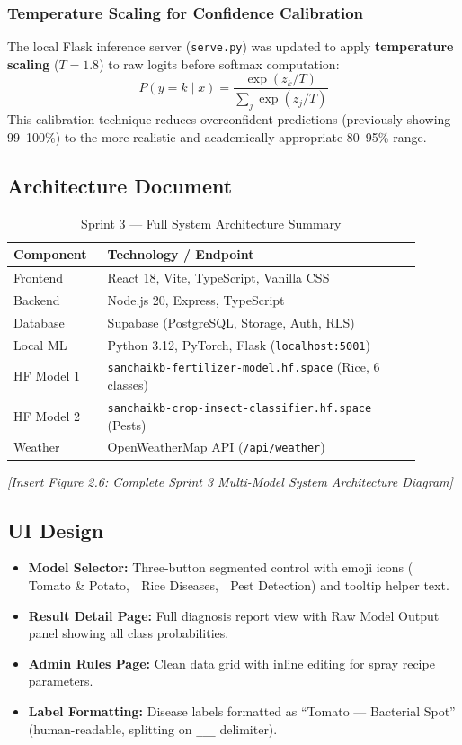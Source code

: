 \documentclass[12pt,a4paper]{report}
\begin{document}
\subsubsection{Temperature Scaling for Confidence Calibration}
The local Flask inference server (\texttt{serve.py}) was updated to apply \textbf{temperature scaling} ($T = 1.8$) to raw logits before softmax computation:
\[
  P(y=k \mid x) = \frac{\exp(z_k / T)}{\sum_{j} \exp(z_j / T)}
\]
This calibration technique reduces overconfident predictions (previously showing 99--100\%) to the more realistic and academically appropriate 80--95\% range.

\subsection{Architecture Document}

\begin{table}[H]
\centering
\caption{Sprint 3 — Full System Architecture Summary}
\begin{tabular}{p{0.2\linewidth} p{0.7\linewidth}}
\toprule
\textbf{Component} & \textbf{Technology / Endpoint} \\
\midrule
Frontend & React 18, Vite, TypeScript, Vanilla CSS \\
Backend  & Node.js 20, Express, TypeScript \\
Database & Supabase (PostgreSQL, Storage, Auth, RLS) \\
Local ML & Python 3.12, PyTorch, Flask (\texttt{localhost:5001}) \\
HF Model 1 & \texttt{sanchaikb-fertilizer-model.hf.space} (Rice, 6 classes) \\
HF Model 2 & \texttt{sanchaikb-crop-insect-classifier.hf.space} (Pests) \\
Weather & OpenWeatherMap API (\texttt{/api/weather}) \\
\bottomrule
\end{tabular}
\end{table}

\textit{[Insert Figure 2.6: Complete Sprint 3 Multi-Model System Architecture Diagram]}

\subsection{UI Design}

\begin{itemize}
  \item \textbf{Model Selector:} Three-button segmented control with emoji icons (🍅 Tomato \& Potato, 🌾 Rice Diseases, 🦗 Pest Detection) and tooltip helper text.
  \item \textbf{Result Detail Page:} Full diagnosis report view with Raw Model Output panel showing all class probabilities.
  \item \textbf{Admin Rules Page:} Clean data grid with inline editing for spray recipe parameters.
  \item \textbf{Label Formatting:} Disease labels formatted as ``Tomato — Bacterial Spot'' (human-readable, splitting on \texttt{\_\_\_} delimiter).
\end{itemize}
\end{document}
